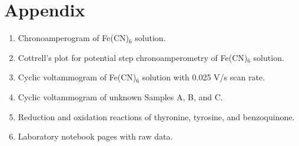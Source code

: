 \documentclass{article}
\begin{document}
\newpage
\section*{Appendix}
\begin{enumerate}
    \item Chronoamperogram of Fe(CN)$_6$ solution.
    \item Cottrell's plot for potential step chronoamperometry of Fe(CN)$_6$
        solution.
    \item Cyclic voltammogram of Fe(CN)$_6$ solution with 0.025 V/s scan rate.
    \item Cyclic voltammogram of unknown Samples A, B, and C.
    \item Reduction and oxidation reactions of thyronine, tyrosine, and
        benzoquinone.
    \item Laboratory notebook pages with raw data.
\end{enumerate}
\end{document}
